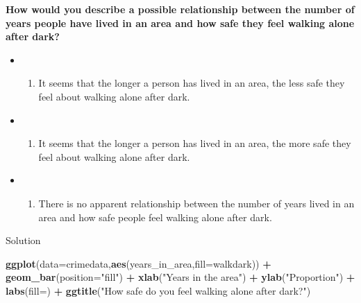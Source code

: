 \documentclass[
]{book}
\newenvironment{Shaded}{\begin{snugshade}}{\end{snugshade}}
\newcommand{\AttributeTok}[1]{\textcolor[rgb]{0.13,0.29,0.53}{#1}}
\newcommand{\FunctionTok}[1]{\textcolor[rgb]{0.13,0.29,0.53}{\textbf{#1}}}
\newcommand{\NormalTok}[1]{#1}
\newcommand{\SpecialCharTok}[1]{\textcolor[rgb]{0.81,0.36,0.00}{\textbf{#1}}}
\newcommand{\StringTok}[1]{\textcolor[rgb]{0.31,0.60,0.02}{#1}}
\providecommand{\tightlist}{%
  \setlength{\itemsep}{0pt}\setlength{\parskip}{0pt}}
\begin{document}
\textbf{How would you describe a possible relationship between the number of years people have lived in an area and how safe they feel walking alone after dark?}

\begin{itemize}
\item
  \begin{enumerate}
  \def\labelenumi{(\Alph{enumi})}
  \tightlist
  \item
    It seems that the longer a person has lived in an area, the less safe they feel about walking alone after dark.\\
  \end{enumerate}
\item
  \begin{enumerate}
  \def\labelenumi{(\Alph{enumi})}
  \setcounter{enumi}{1}
  \tightlist
  \item
    It seems that the longer a person has lived in an area, the more safe they feel about walking alone after dark.\\
  \end{enumerate}
\item
  \begin{enumerate}
  \def\labelenumi{(\Alph{enumi})}
  \setcounter{enumi}{2}
  \tightlist
  \item
    There is no apparent relationship between the number of years lived in an area and how safe people feel walking alone after dark.
  \end{enumerate}
\end{itemize}

Solution

\begin{Shaded}
\begin{Highlighting}[]
\FunctionTok{ggplot}\NormalTok{(}\AttributeTok{data=}\NormalTok{crimedata,}\FunctionTok{aes}\NormalTok{(years\_in\_area,}\AttributeTok{fill=}\NormalTok{walkdark)) }\SpecialCharTok{+} \FunctionTok{geom\_bar}\NormalTok{(}\AttributeTok{position=}\StringTok{"fill"}\NormalTok{) }\SpecialCharTok{+}
  \FunctionTok{xlab}\NormalTok{(}\StringTok{"Years in the area"}\NormalTok{) }\SpecialCharTok{+} \FunctionTok{ylab}\NormalTok{(}\StringTok{"Proportion"}\NormalTok{) }\SpecialCharTok{+}
  \FunctionTok{labs}\NormalTok{(}\AttributeTok{fill=}\StringTok{\textquotesingle{}\textquotesingle{}}\NormalTok{) }\SpecialCharTok{+} \FunctionTok{ggtitle}\NormalTok{(}\StringTok{"How safe do you feel walking alone after dark?"}\NormalTok{)}
\end{Highlighting}
\end{Shaded}
\end{document}
